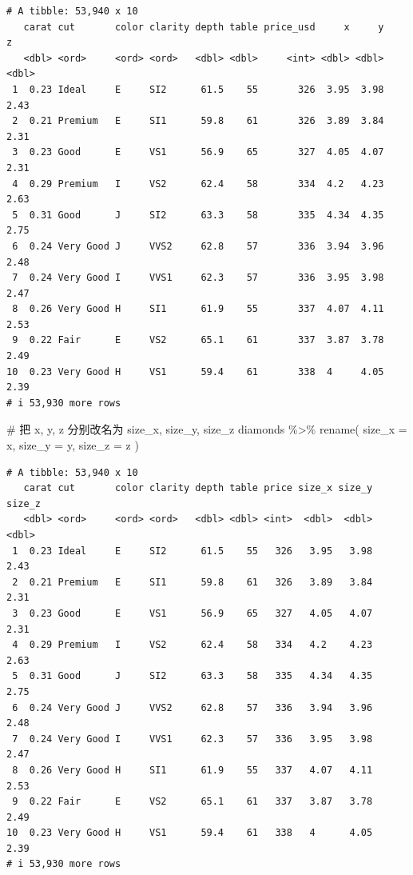 \documentclass[
  letterpaper,
]{ctexbook}
\newenvironment{Shaded}{\begin{snugshade}}{\end{snugshade}}
\newcommand{\AttributeTok}[1]{\textcolor[rgb]{0.40,0.45,0.13}{#1}}
\newcommand{\CommentTok}[1]{\textcolor[rgb]{0.37,0.37,0.37}{#1}}
\newcommand{\FunctionTok}[1]{\textcolor[rgb]{0.28,0.35,0.67}{#1}}
\newcommand{\NormalTok}[1]{\textcolor[rgb]{0.00,0.23,0.31}{#1}}
\newcommand{\SpecialCharTok}[1]{\textcolor[rgb]{0.37,0.37,0.37}{#1}}
\begin{document}
\begin{verbatim}
# A tibble: 53,940 x 10
   carat cut       color clarity depth table price_usd     x     y     z
   <dbl> <ord>     <ord> <ord>   <dbl> <dbl>     <int> <dbl> <dbl> <dbl>
 1  0.23 Ideal     E     SI2      61.5    55       326  3.95  3.98  2.43
 2  0.21 Premium   E     SI1      59.8    61       326  3.89  3.84  2.31
 3  0.23 Good      E     VS1      56.9    65       327  4.05  4.07  2.31
 4  0.29 Premium   I     VS2      62.4    58       334  4.2   4.23  2.63
 5  0.31 Good      J     SI2      63.3    58       335  4.34  4.35  2.75
 6  0.24 Very Good J     VVS2     62.8    57       336  3.94  3.96  2.48
 7  0.24 Very Good I     VVS1     62.3    57       336  3.95  3.98  2.47
 8  0.26 Very Good H     SI1      61.9    55       337  4.07  4.11  2.53
 9  0.22 Fair      E     VS2      65.1    61       337  3.87  3.78  2.49
10  0.23 Very Good H     VS1      59.4    61       338  4     4.05  2.39
# i 53,930 more rows
\end{verbatim}

\begin{Shaded}
\begin{Highlighting}[]
\CommentTok{\# 把 x, y, z 分别改名为 size\_x, size\_y, size\_z}
\NormalTok{diamonds }\SpecialCharTok{\%\textgreater{}\%}
  \FunctionTok{rename}\NormalTok{(}
    \AttributeTok{size\_x =}\NormalTok{ x,}
    \AttributeTok{size\_y =}\NormalTok{ y,}
    \AttributeTok{size\_z =}\NormalTok{ z}
\NormalTok{  )}
\end{Highlighting}
\end{Shaded}

\begin{verbatim}
# A tibble: 53,940 x 10
   carat cut       color clarity depth table price size_x size_y size_z
   <dbl> <ord>     <ord> <ord>   <dbl> <dbl> <int>  <dbl>  <dbl>  <dbl>
 1  0.23 Ideal     E     SI2      61.5    55   326   3.95   3.98   2.43
 2  0.21 Premium   E     SI1      59.8    61   326   3.89   3.84   2.31
 3  0.23 Good      E     VS1      56.9    65   327   4.05   4.07   2.31
 4  0.29 Premium   I     VS2      62.4    58   334   4.2    4.23   2.63
 5  0.31 Good      J     SI2      63.3    58   335   4.34   4.35   2.75
 6  0.24 Very Good J     VVS2     62.8    57   336   3.94   3.96   2.48
 7  0.24 Very Good I     VVS1     62.3    57   336   3.95   3.98   2.47
 8  0.26 Very Good H     SI1      61.9    55   337   4.07   4.11   2.53
 9  0.22 Fair      E     VS2      65.1    61   337   3.87   3.78   2.49
10  0.23 Very Good H     VS1      59.4    61   338   4      4.05   2.39
# i 53,930 more rows
\end{verbatim}
\end{document}
